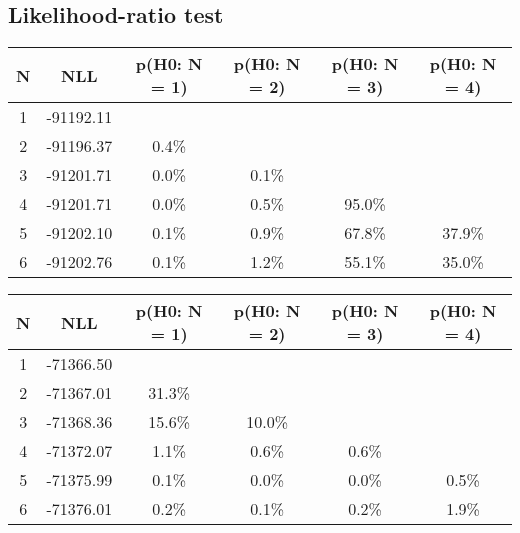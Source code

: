 \subsection{Likelihood-ratio test}
\begin{table}[htb]
	\begin{center}
{\footnotesize\renewcommand{\arraystretch}{1.4}
		\begin{tabular}{cc||cccc}
			N & NLL & p(H0: N = 1) & p(H0: N = 2) & p(H0: N = 3) & p(H0: N = 4)\\ 
		\hline
1 & -91192.11 & & & & \\
2 & -91196.37 & 0.4\% & & & \\
3 & -91201.71 & 0.0\% & 0.1\% & & \\
4 & -91201.71 & 0.0\% & 0.5\% & 95.0\% & \\
5 & -91202.10 & 0.1\% & 0.9\% & 67.8\% & 37.9\% \\
6 & -91202.76 & 0.1\% & 1.2\% & 55.1\% & 35.0\% \\
	\end{tabular}
		\label{tab:lab}
	}
	\end{center}\end{table}

\begin{table}[htb]
	\begin{center}
{\footnotesize\renewcommand{\arraystretch}{1.4}
		\begin{tabular}{cc||cccc}
			N & NLL & p(H0: N = 1) & p(H0: N = 2) & p(H0: N = 3) & p(H0: N = 4)\\ 
		\hline
1 & -71366.50 & & & & \\
2 & -71367.01 & 31.3\% & & & \\
3 & -71368.36 & 15.6\% & 10.0\% & & \\
4 & -71372.07 & 1.1\% & 0.6\% & 0.6\% & \\
5 & -71375.99 & 0.1\% & 0.0\% & 0.0\% & 0.5\% \\
6 & -71376.01 & 0.2\% & 0.1\% & 0.2\% & 1.9\% \\
	\end{tabular}
		\label{tab:lab}
	}
	\end{center}\end{table}

